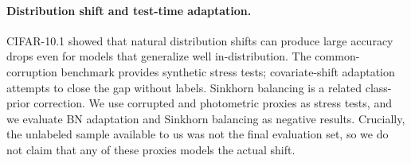 \paragraph{Distribution shift and test-time adaptation.}
CIFAR-10.1 \citep{recht2018cifar} showed that natural
distribution shifts can produce large accuracy drops even for models that
generalize well in-distribution. The common-corruption benchmark
\citep{hendrycks2019benchmarking} provides synthetic stress tests; covariate-shift
adaptation attempts to close the gap without labels. Sinkhorn balancing is a
related class-prior correction. We use corrupted
and photometric proxies as stress tests, and we evaluate BN adaptation and
Sinkhorn balancing as negative results. Crucially, the unlabeled sample available
to us was not the final evaluation set, so we do not claim that any of these
proxies models the actual shift.
